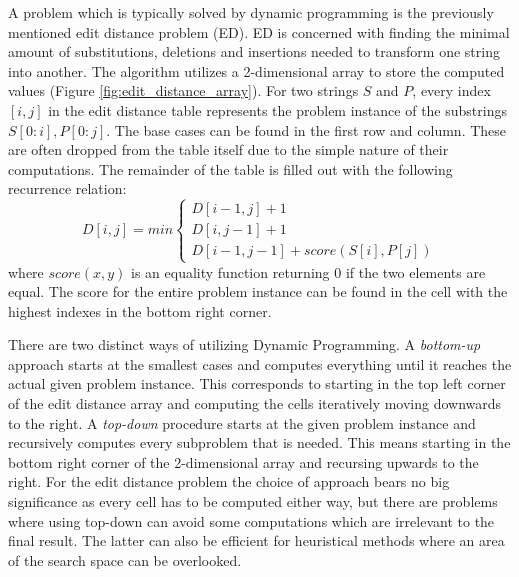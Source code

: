 \documentclass[thesis.tex]{subfiles}
\begin{document}
A problem which is typically solved by dynamic programming is the previously mentioned edit distance problem (ED). ED is concerned with finding the minimal amount of substitutions, deletions and insertions needed to transform one string into another. The algorithm utilizes a 2-dimensional array to store the computed values (Figure \ref{fig:edit_distance_array}). For two strings $S$ and $P$, every index $[i,j]$ in the edit distance table represents the problem instance of the substrings $S[0:i],P[0:j]$. 
\clearpage\noindent
The base cases can be found in the first row and column. These are often dropped from the table itself due to the simple nature of their computations. The remainder of the table is filled out with the following recurrence relation:
\begin{equation}
  D[i,j] = min
  \begin{cases}
    D[i-1,j] + 1\\
    D[i,j-1] + 1\\
    D[i-1,j-1] + score(S[i], P[j])
  \end{cases}
  \label{eq:ed_recurrence_relation}
\end{equation}
where $score(x, y)$ is an equality function returning 0 if the two elements are equal. The score for the entire problem instance can be found in the cell with the highest indexes in the bottom right corner.\\
\par\noindent
There are two distinct ways of utilizing Dynamic Programming. A \textit{bottom-up} approach starts at the smallest cases and computes everything until it reaches the actual given problem instance. This corresponds to starting in the top left corner of the edit distance array and computing the cells iteratively moving downwards to the right. A \textit{top-down} procedure starts at the given problem instance and recursively computes every subproblem that is needed. This means starting in the bottom right corner of the 2-dimensional array and recursing upwards to the right. For the edit distance problem the choice of approach bears no big significance as every cell has to be computed either way, but there are problems where using top-down can avoid some computations which are irrelevant to the final result. The latter can also be efficient for heuristical methods where an area of the search space can be overlooked.
\end{document}
